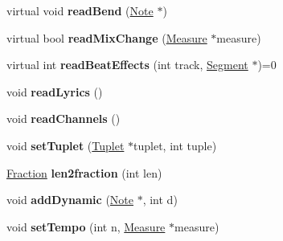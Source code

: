 \begin{DoxyCompactItemize}
\item 
\mbox{\label{class_ms_1_1_guitar_pro_a3de2b01f7e7b06626cdcccbbcc90291a}} 
virtual void {\bfseries read\+Bend} (\hyperlink{class_ms_1_1_note}{Note} $\ast$)
\item 
\mbox{\label{class_ms_1_1_guitar_pro_ae16e9c9028ca268322f7c6921091d547}} 
virtual bool {\bfseries read\+Mix\+Change} (\hyperlink{class_ms_1_1_measure}{Measure} $\ast$measure)
\item 
\mbox{\label{class_ms_1_1_guitar_pro_a0978450e49d1f34a510e6c45dca5a02f}} 
virtual int {\bfseries read\+Beat\+Effects} (int track, \hyperlink{class_ms_1_1_segment}{Segment} $\ast$)=0
\item 
\mbox{\label{class_ms_1_1_guitar_pro_a879ca24117804b5f5397a048bb7df3fb}} 
void {\bfseries read\+Lyrics} ()
\item 
\mbox{\label{class_ms_1_1_guitar_pro_abd8a6dafaf12bd431ab0b5f0cf7a5321}} 
void {\bfseries read\+Channels} ()
\item 
\mbox{\label{class_ms_1_1_guitar_pro_a1cab49045d43388022ef659465ebad58}} 
void {\bfseries set\+Tuplet} (\hyperlink{class_ms_1_1_tuplet}{Tuplet} $\ast$tuplet, int tuple)
\item 
\mbox{\label{class_ms_1_1_guitar_pro_ae7df265f40f802429ba41274b5053c0e}} 
\hyperlink{class_ms_1_1_fraction}{Fraction} {\bfseries len2fraction} (int len)
\item 
\mbox{\label{class_ms_1_1_guitar_pro_aed39376a15a493b823f9070946d58e3c}} 
void {\bfseries add\+Dynamic} (\hyperlink{class_ms_1_1_note}{Note} $\ast$, int d)
\item 
\mbox{\label{class_ms_1_1_guitar_pro_acf0ed269fa76a77b74bfa67e4ca036ff}} 
void {\bfseries set\+Tempo} (int n, \hyperlink{class_ms_1_1_measure}{Measure} $\ast$measure)
\item 
\mbox{\label{class_ms_1_1_guitar_pro_a2d07e488cf7a026d51d65a74b38e0f87}} 

\end{DoxyCompactItemize}
